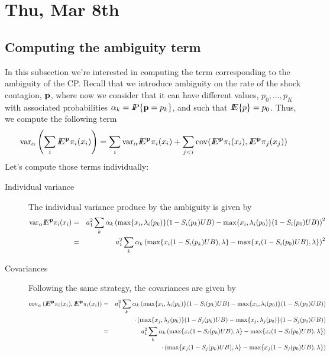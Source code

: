 \section{Thu, Mar 8th}
\subsection{Computing the ambiguity term}
In this subsection we're interested in computing the term corresponding to the ambiguity of the CP.  Recall that we introduce ambiguity on the rate of the shock contagion, ${\bf p}$, where now we consider that it can have different values, $p_0,\ldots,p_K$ with associated probabilities $\alpha_k={I\kern-.35em P}\{{\bf p}=p_k\}$, and such that ${I\kern-.35em E}\{p\}=p_0$.  Thus, we compute the following term
\[{\mathop{\rm var}\nolimits}_\alpha\left(\sum_i {I\kern-.35em E}^{\bf p}\pi_i(x_i)\right)=\sum_i{\mathop{\rm var}\nolimits}_\alpha{I\kern-.35em E}^{\bf p}\pi_i(x_i)+\sum_{j<i}{\mathop{\rm cov}\nolimits}({I\kern-.35em E}^{\bf p}\pi_i(x_i),{I\kern-.35em E}^{\bf p}\pi_j(x_j))\]
Let's compute those terms individually:
\begin{description}
\item[Individual variance] The individual variance produce by the ambiguity is given by
\begin{eqnarray*}
{\mathop{\rm var}\nolimits}_\alpha{I\kern-.35em E}^{\bf p}\pi_i(x_i)&=&a_1^2\sum_{k}\alpha_k \left(\max\{x_i,\lambda_i(p_k)\}(1-S_i(p_k)UB) - \max\{x_i,\lambda_i(p_0)\}(1-S_i(p_0)UB) \right)^2\\
&=&a_1^2\sum_{k}\alpha_k \left(\max\{x_i(1-S_i(p_k)UB),\lambda\} - \max\{x_i(1-S_i(p_0)UB),\lambda\} \right)^2
\end{eqnarray*}
\item[Covariances] Following the same strategy, the covariances are given by
\begin{eqnarray*}
{\mathop{\rm cov}\nolimits}_\alpha\left({I\kern-.35em E}^{\bf p}\pi_i(x_i),{I\kern-.35em E}^{\bf p}\pi_i(x_i)\right)&=&a_1^2\sum_{k}\alpha_k \left(\max\{x_i,\lambda_i(p_k)\}(1-S_i(p_k)UB) - \max\{x_i,\lambda_i(p_0)\}(1-S_i(p_0)UB) \right)\\
&&\quad\quad\cdot\left(\max\{x_j,\lambda_j(p_k)\}(1-S_j(p_k)UB) - \max\{x_j,\lambda_j(p_0)\}(1-S_j(p_0)UB) \right)\\
&=&a_1^2\sum_{k}\alpha_k \left(\max\{x_i(1-S_i(p_k)UB),\lambda\} - \max\{x_i(1-S_i(p_0)UB),\lambda\} \right)\\
&&\quad\quad\cdot\left(\max\{x_j(1-S_j(p_k)UB),\lambda\} - \max\{x_j(1-S_j(p_0)UB),\lambda\} \right)
\end{eqnarray*} 
\end{description}